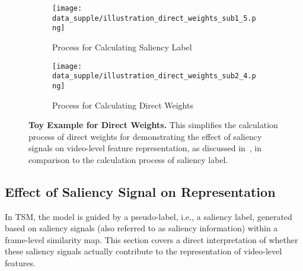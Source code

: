 \documentclass[10pt,twocolumn,letterpaper]{article}
\begin{document}
    \begin{figure}[t]
            \begin{subfigure}{\linewidth}
                \centering
                \texttt{[image: data\_supple/illustration\_direct\_weights\_sub1\_5.png]}
                \vspace{-6mm}
                \caption{Process for Calculating Saliency Label}
                \label{fig:dw_sub1}
            \end{subfigure}
            \begin{subfigure}{\linewidth}
            \vspace{6mm}
                \centering
                \texttt{[image: data\_supple/illustration\_direct\_weights\_sub2\_4.png]}
                \vspace{-6mm}
                \caption{Process for Calculating Direct Weights}
                \label{fig:dw_sub2}
            \end{subfigure}
    
            \caption{\textbf{Toy Example for Direct Weights.} This simplifies the calculation process of direct weights for demonstrating the effect of saliency signals on video-level feature representation, as discussed in~, in comparison to the calculation process of saliency label.\vspace{4mm}}
            \label{fig:dw_all}
        \end{figure}
        
    
    
    \subsection{Effect of Saliency Signal on Representation} \label{effect_saliency_signal}
       
        In TSM, the model is guided by a pseudo-label, i.e., a saliency label, generated based on saliency signals (also referred to as saliency information) within a frame-level similarity map. This section covers a direct interpretation of whether these saliency signals actually contribute to the representation of video-level features.
\end{document}

